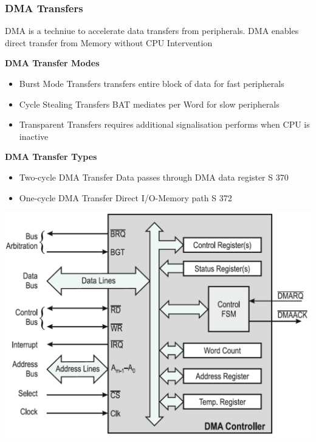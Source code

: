 \subsubsection{DMA Transfers }
\begin{minipage}{0.8\linewidth}
        DMA is a techniue to accelerate data transfers from peripherals.\newline
        DMA enables direct transfer from Memory without CPU Intervention
        \begin{multicols}{2}
            \begin{minipage}{\linewidth}
                \textbf{DMA Transfer Modes}
                \begin{itemize}
                    \item Burst Mode Transfers
                        \subitem transfers entire block of data
                        \subitem for fast peripherals
                    \item Cycle Stealing Transfers
                        \subitem BAT mediates per Word
                        \subitem for slow peripherals
                    \item Transparent Transfers
                        \subitem requires additional signalisation
                        \subitem performs when CPU is inactive
                \end{itemize}
            \end{minipage}
        
            \begin{minipage}{\linewidth}
                \textbf{DMA Transfer Types}
                \begin{itemize}
                    \item Two-cycle DMA Transfer
                        \subitem Data passes through
                        \subitem DMA data register
                        \subitem S 370
                    \item One-cycle DMA Transfer
                        \subitem Direct I/O-Memory path
                        \subitem S 372
                \end{itemize}
            \end{minipage}
        \end{multicols}
\end{minipage}
\hspace{-1.5cm}
\begin{minipage}{0.2\linewidth}
    \includegraphics[width=1.5\linewidth]{images/DMAController}
\end{minipage}
    
\clearpage
\pagebreak